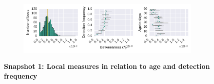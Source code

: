 \begin{figure}[!h]
\begin{subfigure}[b]{1.0\textwidth}
	\end{subfigure}
	\begin{subfigure}[b]{1.0\textwidth}
	\centering
	\includegraphics[width=1.0\textwidth]{Figures/n1-stat-betweenAgeDetF.pdf}
	\end{subfigure}
	\caption[Snapshot 1: Local measures in relation to age and detection frequency]{\textbf{Snapshot 1: Local measures in relation to age and detection frequency}}
	\label{fig:n1-degreeStrLCC}
\end{figure}

